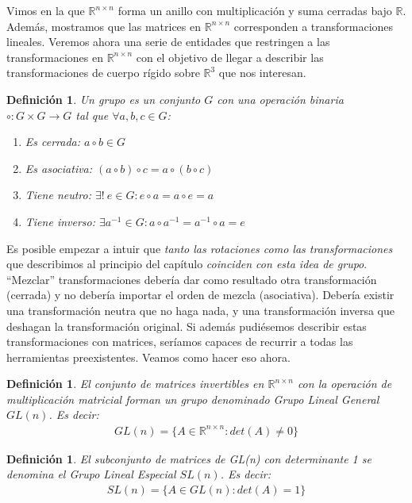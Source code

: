 \documentclass[ twoside,openright,titlepage,numbers=noenddot,%
                headinclude,footinclude,cleardoublepage=empty,abstract=on,
                BCOR=-5mm,paper=a4,fontsize=11pt
                ]{scrreprt}
\newtheorem{definition}[theorem]{Definición}
\newcommand{\R}{\mathbb{R}}
\newcommand{\Rnn}{\R^{n \times n}}
\begin{document}
Vimos en la  que \(\Rnn\) forma un anillo con
multiplicación y suma cerradas bajo \(\R\). Además, mostramos que las
matrices en \(\Rnn\) corresponden a transformaciones lineales. Veremos
ahora una serie de entidades que restringen a las transformaciones en
\(\Rnn\) con el objetivo de llegar a describir las transformaciones de
cuerpo rígido sobre \(\R^3\) que nos interesan.

\begin{definition}Un grupo es un conjunto \(G\) con una operación
binaria \newline \(\circ : G \times G \rightarrow G\) tal que
\(\forall a, b, c \in G\): \bigbreak

\begin{enumerate}
  \item Es cerrada: $a \circ b \in G$
  \item Es asociativa: $(a \circ b) \circ c = a \circ (b \circ c)$
  \item Tiene neutro: $\exists!\ e \in G: e \circ a = a \circ e = a$
  \item Tiene inverso: $\exists a^{-1} \in G: a \circ a^{-1} = a^{-1} \circ a = e$
\end{enumerate}

\end{definition}

Es posible empezar a intuir que \emph{tanto las rotaciones como las
transformaciones} que describimos al principio del capítulo
\emph{coinciden con esta idea de grupo}. ``Mezclar'' transformaciones
debería dar como resultado otra transformación (cerrada) y no debería
importar el orden de mezcla (asociativa). Debería existir una
transformación neutra que no haga nada, y una transformación inversa que
deshagan la transformación original. Si además pudiésemos describir
estas transformaciones con matrices, seríamos capaces de recurrir a
todas las herramientas preexistentes. Veamos como hacer eso ahora.

\begin{definition}El conjunto de matrices invertibles en \(\Rnn\) con la
operación de multiplicación matricial forman un grupo denominado Grupo
Lineal General \(GL(n)\). Es decir: \begin{align}
  GL(n) = \{ A \in \Rnn : det(A) \neq 0 \}
\end{align}\end{definition}

\begin{definition}El subconjunto de matrices de GL(n) con determinante 1
se denomina el Grupo Lineal Especial \(SL(n)\). Es decir: \begin{align}
  SL(n) = \{ A \in GL(n) : det(A) = 1 \}
\end{align}\end{definition}
\end{document}
